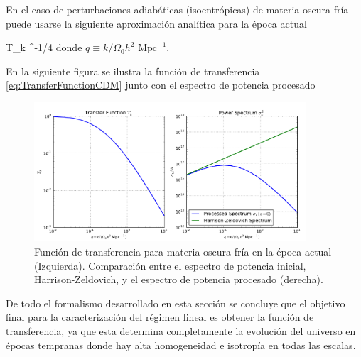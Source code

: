 En el caso de perturbaciones adiabáticas (isoentrópicas) de materia 
oscura fría puede usarse la siguiente aproximación analítica para la 
época actual \cite{longair2008}


{ T_k \approx {}
^{-1/4} }
donde $q \equiv k/\Omega_0 h^{2} \mbox{ Mpc}^{-1} $.


En la siguiente figura se ilustra la función de transferencia 
\ref{eq:TransferFunctionCDM} junto con el espectro de potencia procesado

\begin{figure}[htbp]
	\centering
	\includegraphics[width=0.9\textwidth]
	{./figures/2_theoretical_framework/Transfer_Function.pdf}

	\caption{\small{Función de transferencia para materia oscura fría en la
	época actual \cite{longair2008} (Izquierda). Comparación entre el 
	espectro de potencia inicial, Harrison-Zeldovich, y el espectro de 
	potencia procesado (derecha).}}
	
	\label{fig:TransferFunctionCDM}
\end{figure}


De todo el formalismo desarrollado en esta sección se concluye que el 
objetivo final para la caracterización del régimen lineal es obtener la 
función de transferencia, ya que esta determina completamente la 
evolución del universo en épocas tempranas donde hay alta homogeneidad e
isotropía en todas las escalas.






